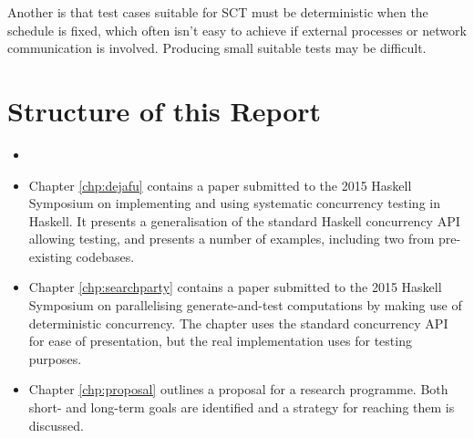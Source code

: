 Another is that test cases suitable for SCT must be deterministic when
the schedule is fixed, which often isn't easy to achieve if external
processes or network communication is involved. Producing small
suitable tests may be difficult.

\section{Structure of this Report}
\label{sec:intro-outline}

\begin{itemize}
  \item {}
  \item Chapter \ref{chp:dejafu} contains a paper submitted to the
    2015 Haskell Symposium\cite{dejafu} on implementing and using
    systematic concurrency testing in Haskell. It presents a
    generalisation of the standard Haskell concurrency API allowing
    testing, and presents a number of examples, including two from
    pre-existing codebases.

  \item Chapter \ref{chp:searchparty} contains a paper submitted to
    the 2015 Haskell Symposium\cite{searchparty} on parallelising
    generate-and-test computations by making use of deterministic
    concurrency. The chapter uses the standard concurrency API for
    ease of presentation, but the real implementation uses \dejafu{}
    for testing purposes.
  \item Chapter \ref{chp:proposal} outlines a proposal for a research
    programme. Both short- and long-term goals are identified and a
    strategy for reaching them is discussed.
\end{itemize}
